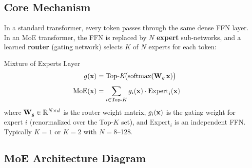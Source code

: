 \subsection{Core Mechanism}

In a standard transformer, every token passes through the same dense FFN
layer.  In an MoE transformer, the FFN is replaced by $N$ \textbf{expert}
sub-networks, and a learned \textbf{router} (gating network) selects $K$ of
$N$ experts for each token:

\begin{mathresult}{Mixture of Experts Layer}
\begin{align}
g(\mathbf{x}) &= \text{Top-}K\!\bigl(\operatorname{softmax}(\mathbf{W}_g \,\mathbf{x})\bigr)
\label{eq:moe_gate} \\[4pt]
\text{MoE}(\mathbf{x}) &= \sum_{i \in \text{Top-}K} g_i(\mathbf{x}) \cdot \text{Expert}_i(\mathbf{x})
\label{eq:moe_output}
\end{align}
where $\mathbf{W}_g \in \mathbb{R}^{N \times d}$ is the router weight matrix, $g_i(\mathbf{x})$ is
the gating weight for expert $i$ (renormalized over the Top-$K$ set), and
$\text{Expert}_i$ is an independent FFN.  Typically $K = 1$ or $K = 2$ with
$N = 8$--128.
\end{mathresult}

\subsection{MoE Architecture Diagram}

